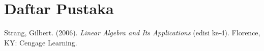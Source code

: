 \section{Daftar Pustaka}

Strang, Gilbert. (2006). \textit{Linear Algebra and Its Applications} (edisi ke-4). Florence, KY: Cengage Learning.

\pagebreak